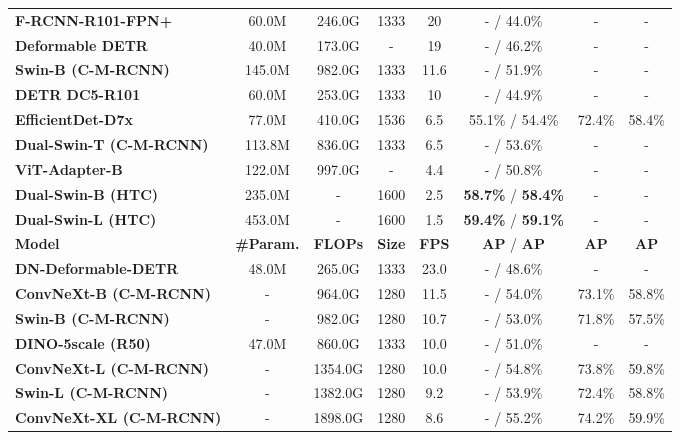 \documentclass[10pt,twocolumn,letterpaper]{article}
\begin{document}
\begin{table*}[t]
\begin{threeparttable}[t]
\begin{tabular}{l|c|c|c|c|c|c|c}
					\midrule
					\textbf{F-RCNN-R101-FPN+ \cite{carion2020end}} & 60.0M & 246.0G & 1333 &  20 & - / 44.0\% & - & - \\
					\textbf{Deformable DETR \cite{zhu2021deformable}} & 40.0M & 173.0G & - &  19 & - / 46.2\% & - & - \\
					\textbf{Swin-B (C-M-RCNN) \cite{liu2021swin}} & 145.0M & 982.0G & 1333 &  11.6 & - / 51.9\% & - & - \\
					\textbf{DETR DC5-R101 \cite{carion2020end}} & 60.0M & 253.0G & 1333 &  10 & - / 44.9\% & - & - \\
					\textbf{EfficientDet-D7x \cite{tan2020efficientdet}} & 77.0M & 410.0G & 1536 &  6.5 & 55.1\% / 54.4\% &  72.4\% & 58.4\% \\
					\textbf{Dual-Swin-T (C-M-RCNN) \cite{liang2021cbnetv2}} & 113.8M & 836.0G & 1333 &  6.5 & - / 53.6\% & - & - \\
\textbf{ViT-Adapter-B \cite{chen2022vision}} & 122.0M & 997.0G & - & 4.4 & - / 50.8\% & - & - \\
					\textbf{Dual-Swin-B (HTC) \cite{liang2021cbnetv2}} & 235.0M & - & 1600 & 2.5 & \textbf{58.7\%} / \textbf{58.4\%} & - & - \\
					\textbf{Dual-Swin-L (HTC) \cite{liang2021cbnetv2}} & 453.0M & - & 1600 & 1.5 & \textbf{59.4\%} / \textbf{59.1\%} & - & - \\
					\bottomrule
					\toprule
					\textbf{Model} & \textbf{\#Param.} & \textbf{FLOPs} & \textbf{Size} & \textbf{FPS} & \textbf{AP} / \textbf{AP} & \textbf{AP} & \textbf{AP} \\
					\midrule
\textbf{DN-Deformable-DETR \cite{li2022dn}} & 48.0M & 265.0G & 1333 &  23.0 & - / 48.6\% & - & - \\
					\textbf{ConvNeXt-B (C-M-RCNN) \cite{liu2022convnext}} & - & 964.0G & 1280 &  11.5 & - / 54.0\% & 73.1\% & 58.8\% \\
					\textbf{Swin-B (C-M-RCNN) \cite{liu2021swin}} & - & 982.0G & 1280 &  10.7 & - / 53.0\% & 71.8\% & 57.5\% \\
					\textbf{DINO-5scale (R50) \cite{zhang2022dino}} & 47.0M & 860.0G & 1333 &  10.0 & - / 51.0\% & - & - \\
					\textbf{ConvNeXt-L (C-M-RCNN) \cite{liu2022convnext}} & - & 1354.0G & 1280 &  10.0 & - / 54.8\% & 73.8\% & 59.8\% \\
					\textbf{Swin-L (C-M-RCNN) \cite{liu2021swin}} & - & 1382.0G & 1280 &  9.2 & - / 53.9\% & 72.4\% & 58.8\% \\
					\textbf{ConvNeXt-XL (C-M-RCNN) \cite{liu2022convnext}} & - & 1898.0G & 1280 &  8.6 & - / 55.2\% & 74.2\% & 59.9\% \\
					\bottomrule
\end{tabular}
\end{threeparttable}
		\vspace{-3mm}
		\end{table*}
	
\end{document}
